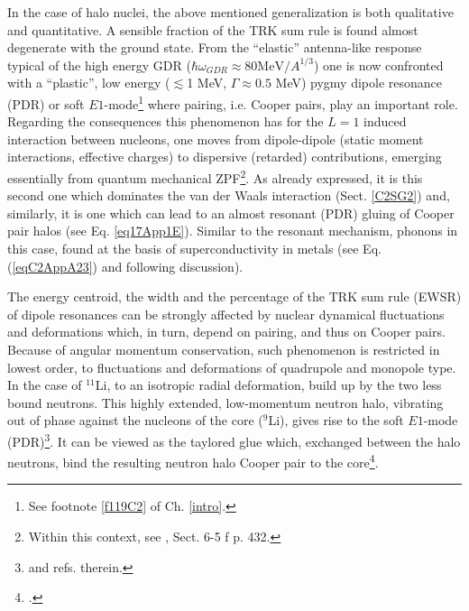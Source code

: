 In the case of halo nuclei, the above mentioned generalization is both qualitative and  quantitative. A sensible fraction of the TRK sum rule is found almost degenerate with the ground state. From the ``elastic'' antenna-like response typical of the high energy GDR ($\hbar\omega_{GDR}\approx80\text{MeV}/A^{1/3}$)  one is now confronted with a ``plastic'', low energy ($\lesssim$1 MeV, $\Gamma\approx0.5$ MeV)  pygmy dipole resonance (PDR) or soft $E1$-mode\footnote{See footnote \ref{f119C2} of Ch. \ref{intro}.} where pairing, i.e. Cooper pairs, play an important role. Regarding the consequences this phenomenon has for the $L=1$ induced interaction between nucleons, one moves from dipole-dipole (static moment interactions, effective charges) to dispersive (retarded) contributions, emerging essentially from quantum mechanical ZPF\footnote{Within this context, see \cite{Bohr:75}, Sect. 6-5 f p. 432.}. As already expressed, it is this second one which dominates the van der Waals interaction 
 (Sect. \ref{C2SG2}) and, similarly, it is one which can lead to an almost resonant (PDR) gluing of Cooper pair halos (see Eq. \ref{eq17App1E}). Similar to the resonant  mechanism, phonons in this case,  found  at the basis of superconductivity in metals (see Eq. (\ref{eqC2AppA23}) and  following discussion). 

  The energy centroid, the width and the percentage of the TRK sum rule (EWSR) of dipole resonances can be strongly affected by nuclear dynamical fluctuations and deformations which, in turn, depend on pairing, and thus on Cooper pairs. Because of angular momentum conservation, such phenomenon is restricted in lowest order, to fluctuations and deformations of quadrupole and monopole type. In the case of $^{11}$Li, to an isotropic radial deformation, build up by the two less bound neutrons. This highly extended, low-momentum neutron halo, vibrating out of phase against the nucleons of the core ($^9$Li), gives rise to the soft $E1$-mode (PDR)\footnote{\cite{Broglia:19} and refs. therein.}.  It can be viewed as the taylored glue 
   which, exchanged between the halo neutrons, bind the resulting neutron halo Cooper pair to the core\footnote{\cite{Barranco:01}.}.


